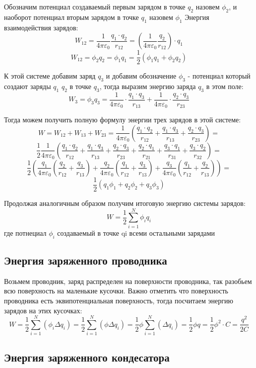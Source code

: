 \documentclass[../main.tex]{subfiles}
\begin{document}
Обозначим потенциал создаваемый первым зарядом в точке $q_2$ назовем $\phi_2$, и наоборот потенциал вторым зарядом в точке $q_1$ назовем $\phi_1$
Энергия взаимодействия зарядов:
\[W_{12} = \frac{1}{4 \pi \varepsilon_0} \frac{q_1 \cdot q_2}{r_{12}} = (\frac{1}{4 \pi \varepsilon_0} \frac{q_2}{r_{12}}) \cdot q_1\]
\[W_{12} = \phi_2 q_2 = \phi_1 q_1 = \frac{1}{2} (\phi_1 q_1 + \phi_2 q_2)\]

К этой системе добавим заряд $q_3$ и добавим обозначение $\phi_3$ - потенциал который создают заряды $q_1$ $q_2$ в точке $q_3$,
тогда выразим энергию заряда $q_3$ в этом поле:
\[W_3 = \phi_3 q_3 = \frac{1}{4 \pi \varepsilon_0} \cdot \frac{q_1 \cdot q_3}{r_{13}} + \frac{1}{4 \pi \varepsilon_0} \cdot \frac{q_2 \cdot q_3}{r_{23}}\]

Тогда можем получить полную формулу энергии трех зарядов в этой системе:
\[W = W_{12} + W_{13} + W_{23} = \frac{1}{4 \pi \varepsilon_0} (\frac{q_1 \cdot q_2}{r_{12}} + \frac{q_1 \cdot q_3}{r_{13}}+ \frac{q_2 \cdot q_3}{r_{23}}) = \]
\[ \frac{1}{2}\frac{1}{4 \pi \varepsilon_0}(\frac{q_1 \cdot q_2}{r_{12}} + \frac{q_1 \cdot q_3}{r_{13}}+ \frac{q_2 \cdot q_3}{r_{23}} + \frac{q_2 \cdot q_1}{r_{21}} + \frac{q_3 \cdot q_1}{r_{31}}+ \frac{q_3 \cdot q_2}{r_{32}}) = \]
\[ \frac{1}{2}(\frac{q_1}{4 \pi \varepsilon_0}(\frac{q_2}{r_{12}} + \frac{q_3}{r_{13}}) + \frac{q_2}{4 \pi \varepsilon_0}(\frac{q_1}{r_{12}} + \frac{q_3}{r_{13}}) + \frac{q_3}{4 \pi \varepsilon_0}(\frac{q_1}{r_{12}} + \frac{q_2}{r_{13}}) ) = \]
\[ \frac{1}{2} (q_1 \phi_1 + q_2 \phi_2  + q_3 \phi_3) \]

Продолжая аналогичным образом получим итоговую энергию системы зарядов:
\[W = \frac{1}{2} \sum_{i=1}^{N} \phi_i q_i\]
где потнециал $\phi_i$ создаваемый в точке qi всеми остальными зарядами

\subsection{Энергия заряженного проводника}
Возьмем проводник, заряд распределен на поверхности проводника, так разобьем всю поверхность на маленькие кусочки.
Важно отметить что поверхность проводника есть эквипотенциальная поверхность, тогда посчитаем энергию зарядов на этих кусочках:
\[W = \frac{1}{2} \sum_{i=1}^{N} (\phi_i \Delta q_i) = \frac{1}{2} \sum_{i=1}^{N} (\phi \Delta q_i) =
    \frac{1}{2} \phi \sum_{i=1}^{N} (\Delta q_i) = \frac{1}{2} \phi q = \frac{1}{2} \phi^2 \cdot C = \frac{q^2}{2C}
\]
\subsection{Энергия заряженного кондесатора}
\end{document}
